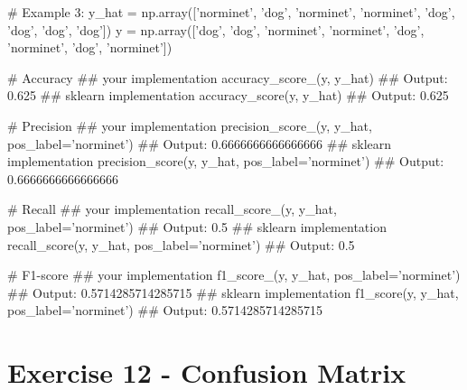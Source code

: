 \documentclass[]{article}
\newenvironment{Shaded}{\begin{snugshade}}{\end{snugshade}}
\newcommand{\CommentTok}[1]{\textcolor[rgb]{0.48,0.49,0.49}{#1}}
\newcommand{\FloatTok}[1]{\textcolor[rgb]{0.96,0.45,0.00}{#1}}
\newcommand{\NormalTok}[1]{\textcolor[rgb]{0.81,0.81,0.76}{#1}}
\newcommand{\OperatorTok}[1]{\textcolor[rgb]{0.81,0.81,0.76}{#1}}
\newcommand{\StringTok}[1]{\textcolor[rgb]{0.96,0.31,0.31}{#1}}
\begin{document}
\begin{Shaded}
\begin{Highlighting}[]
\CommentTok{# Example 3:}
\NormalTok{y_hat }\OperatorTok{=}\NormalTok{ np.array([}\StringTok{'norminet'}\NormalTok{, }\StringTok{'dog'}\NormalTok{, }\StringTok{'norminet'}\NormalTok{, }\StringTok{'norminet'}\NormalTok{, }\StringTok{'dog'}\NormalTok{, }\StringTok{'dog'}\NormalTok{, }\StringTok{'dog'}\NormalTok{, }\StringTok{'dog'}\NormalTok{])}
\NormalTok{y }\OperatorTok{=}\NormalTok{ np.array([}\StringTok{'dog'}\NormalTok{, }\StringTok{'dog'}\NormalTok{, }\StringTok{'norminet'}\NormalTok{, }\StringTok{'norminet'}\NormalTok{, }\StringTok{'dog'}\NormalTok{, }\StringTok{'norminet'}\NormalTok{, }\StringTok{'dog'}\NormalTok{, }\StringTok{'norminet'}\NormalTok{])}

\CommentTok{# Accuracy}
\CommentTok{## your implementation}
\NormalTok{accuracy_score_(y, y_hat)}
\CommentTok{## Output:}
\FloatTok{0.625}
\CommentTok{## sklearn implementation}
\NormalTok{accuracy_score(y, y_hat)}
\CommentTok{## Output:}
\FloatTok{0.625}

\CommentTok{# Precision}
\CommentTok{## your implementation}
\NormalTok{precision_score_(y, y_hat, pos_label}\OperatorTok{=}\StringTok{'norminet'}\NormalTok{)}
\CommentTok{## Output:}
\FloatTok{0.6666666666666666}
\CommentTok{## sklearn implementation}
\NormalTok{precision_score(y, y_hat, pos_label}\OperatorTok{=}\StringTok{'norminet'}\NormalTok{)}
\CommentTok{## Output:}
\FloatTok{0.6666666666666666}

\CommentTok{# Recall}
\CommentTok{## your implementation}
\NormalTok{recall_score_(y, y_hat, pos_label}\OperatorTok{=}\StringTok{'norminet'}\NormalTok{)}
\CommentTok{## Output:}
\FloatTok{0.5}
\CommentTok{## sklearn implementation}
\NormalTok{recall_score(y, y_hat, pos_label}\OperatorTok{=}\StringTok{'norminet'}\NormalTok{)}
\CommentTok{## Output:}
\FloatTok{0.5}

\CommentTok{# F1-score}
\CommentTok{## your implementation}
\NormalTok{f1_score_(y, y_hat, pos_label}\OperatorTok{=}\StringTok{'norminet'}\NormalTok{)}
\CommentTok{## Output:}
\FloatTok{0.5714285714285715}
\CommentTok{## sklearn implementation}
\NormalTok{f1_score(y, y_hat, pos_label}\OperatorTok{=}\StringTok{'norminet'}\NormalTok{)}
\CommentTok{## Output:}
\FloatTok{0.5714285714285715}
\end{Highlighting}
\end{Shaded}

\clearpage

\hypertarget{exercise-12---confusion-matrix-1}{%
\section{Exercise 12 - Confusion
Matrix}\label{exercise-12---confusion-matrix-1}}
\end{document}
